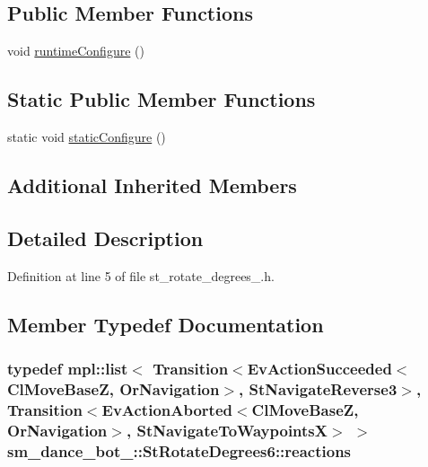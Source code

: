 \subsection*{Public Member Functions}
\begin{DoxyCompactItemize}
\item 
void \hyperlink{structsm__dance__bot__3_1_1StRotateDegrees6_aaf2ab2fec6cc45804363a377e7535f74}{runtime\+Configure} ()
\end{DoxyCompactItemize}
\subsection*{Static Public Member Functions}
\begin{DoxyCompactItemize}
\item 
static void \hyperlink{structsm__dance__bot__3_1_1StRotateDegrees6_a6d7cfebf4f58f87af64e40d0546f0c1c}{static\+Configure} ()
\end{DoxyCompactItemize}
\subsection*{Additional Inherited Members}


\subsection{Detailed Description}


Definition at line 5 of file st\+\_\+rotate\+\_\+degrees\+\_.\+h.



\subsection{Member Typedef Documentation}
\subsubsection[{\texorpdfstring{reactions}{reactions}}]{\setlength{\rightskip}{0pt plus 5cm}typedef mpl\+::list$<$ Transition$<$Ev\+Action\+Succeeded$<${\bf Cl\+Move\+BaseZ}, {\bf Or\+Navigation}$>$, {\bf St\+Navigate\+Reverse3}$>$, Transition$<$Ev\+Action\+Aborted$<${\bf Cl\+Move\+BaseZ}, {\bf Or\+Navigation}$>$, {\bf St\+Navigate\+To\+WaypointsX}$>$ $>$ {\bf sm\+\_\+dance\+\_\+bot\+\_\+::\+St\+Rotate\+Degrees6\+::reactions}}\hypertarget{structsm__dance__bot__3_1_1StRotateDegrees6_adef02f1a6023cb6da55ee18b9e45aa4a}{}\label{structsm__dance__bot__3_1_1StRotateDegrees6_adef02f1a6023cb6da55ee18b9e45aa4a}


